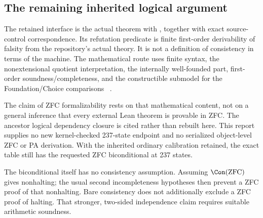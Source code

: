 \subsection{The remaining inherited logical argument}

The retained interface is the actual
 theorem with
, together with exact source-control
correspondence.  Its refutation predicate is finite first-order
derivability of falsity from the repository's actual
 theory.  It is not a definition of consistency in
terms of the machine.  The mathematical route uses finite syntax,
the nonextensional quotient interpretation, the internally
well-founded part, first-order soundness/completeness, and the
constructible submodel for the Foundation/Choice comparisons
~\cite{rotation240,m254,m254sets}.

The claim of ZFC formalizability rests on that mathematical
content, not on a general inference that every external Lean
theorem is provable in ZFC.  The ancestor logical dependency
closure is cited rather than rebuilt here.  This report supplies
no new kernel-checked 237-state endpoint and no serialized
object-level ZFC or PA derivation.  With the inherited ordinary
calibration retained, the exact table still has the requested
ZFC biconditional at 237 states.

The biconditional itself has no consistency assumption.
Assuming $\Con(\mathrm{ZFC})$ gives nonhalting; the usual second
incompleteness hypotheses then prevent a ZFC proof of that
nonhalting.  Bare consistency does not additionally exclude a
ZFC proof of halting.  That stronger, two-sided independence
claim requires suitable arithmetic soundness.
